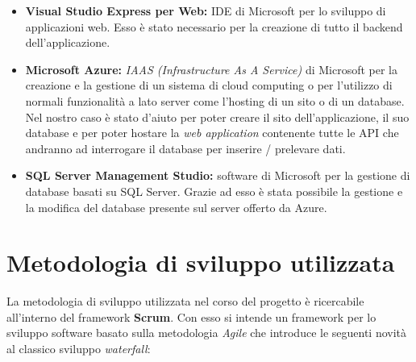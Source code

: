 \documentclass[a4]{book}
\begin{document}
\begin{itemize}
	\item \textbf{Visual Studio Express per Web:} IDE di Microsoft per lo sviluppo di applicazioni web. Esso è stato necessario per la creazione di tutto il backend dell'applicazione.
	
	\item \textbf{Microsoft Azure: }\textit{IAAS (Infrastructure As A Service)} di Microsoft per la creazione e la gestione di un sistema di cloud computing o per l'utilizzo di normali funzionalità a lato server come l'hosting di un sito o di un database. Nel nostro caso è stato d'aiuto per poter creare il sito dell'applicazione, il suo database e per poter hostare la \textit{web application} contenente tutte le API che andranno ad interrogare il database per inserire / prelevare dati.
	
	\item \textbf{SQL Server Management Studio:} software di Microsoft per la gestione di database basati su SQL Server. Grazie ad esso è stata possibile la gestione e la modifica del database presente sul server offerto da Azure.
\end{itemize}

\chapter{Metodologia di sviluppo utilizzata}
La metodologia di sviluppo utilizzata nel corso del progetto è ricercabile all'interno del framework \textbf{Scrum}. Con esso si intende un framework per lo sviluppo software basato sulla metodologia \textit{Agile} che introduce le seguenti novità al classico sviluppo \textit{waterfall}:
\end{document}
